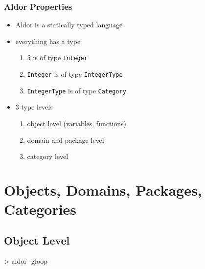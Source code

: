 \begin{frame}[fragile]
  \frametitle{Aldor Properties}

  \begin{itemize}
  \item Aldor is a statically typed language
  \item everything has a type
    \begin{enumerate}
    \item 5 is of type \texttt{Integer}
    \item \texttt{Integer} is of type \texttt{IntegerType}
    \item \texttt{IntegerType} is of type \texttt{Category}
    \end{enumerate}
  \item 3 type levels
    \begin{enumerate}
    \item object level (variables, functions)
    \item domain and package level
    \item category level
    \end{enumerate}
  \end{itemize}
\end{frame}














\section{Objects, Domains, Packages, Categories}

\subsection{Object Level}
\begin{myverbatim}
> aldor -gloop
\end{myverbatim}

